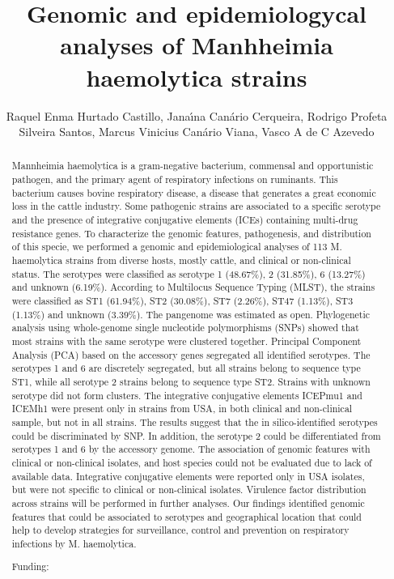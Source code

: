 \documentclass[twoside]{article}
\title{\vspace{-15mm}\fontsize{24pt}{10pt}\selectfont\textbf{ Genomic and epidemiologycal analyses of Manhheimia haemolytica strains }} %
\author{ Raquel Enma Hurtado Castillo, Jana\'{\i}na Can\'ario Cerqueira, Rodrigo Profeta Silveira Santos, Marcus Vinicius Can\'ario Viana, Vasco A de C Azevedo }
\affil{ UFMG }
\date{}
\begin{document}
  
  
  \maketitle %
  
  
  \thispagestyle{fancy} %
  
  
  \begin{abstract}
  Mannheimia haemolytica is a gram-negative bacterium,  commensal and opportunistic pathogen,  and the primary agent of respiratory infections on ruminants. This bacterium causes bovine respiratory disease,  a disease that generates a great economic loss in the cattle industry. Some pathogenic strains are associated to a specific serotype and the presence of integrative conjugative elements (ICEs) containing multi-drug resistance genes. To characterize the genomic features,  pathogenesis,  and distribution of this specie,  we performed a genomic and epidemiological analyses of 113 M. haemolytica strains from diverse hosts,  mostly cattle,  and clinical or non-clinical status. The serotypes were classified as serotype 1 (48.67\%),  2 (31.85\%),  6 (13.27\%) and unknown (6.19\%). According to Multilocus Sequence Typing (MLST),  the strains were classified as  ST1 (61.94\%),  ST2 (30.08\%),  ST7 (2.26\%),  ST47 (1.13\%),  ST3 (1.13\%) and unknown (3.39\%). The pangenome was estimated as open. Phylogenetic analysis using whole-genome single nucleotide polymorphisms (SNPs) showed that most strains with the same serotype were clustered together. Principal Component Analysis (PCA) based on the accessory genes segregated all identified serotypes. The serotypes 1 and 6 are discretely segregated,  but all strains belong to sequence type ST1,  while all serotype 2 strains belong to sequence type ST2. Strains with unknown serotype did not form clusters. The integrative conjugative elements ICEPmu1 and ICEMh1 were present only in strains from USA,  in both clinical and non-clinical sample,  but not in all strains. The results suggest that the in silico-identified serotypes could be discriminated by SNP. In addition,  the serotype 2 could be differentiated from serotypes 1 and 6 by the accessory genome. The association of genomic features with clinical or non-clinical isolates,  and host species could not be evaluated due to lack of available data. Integrative conjugative elements were reported only in USA isolates,  but were not specific to clinical or non-clinical isolates. Virulence factor distribution across strains will be performed in further analyses. Our findings identified genomic features that could be associated to serotypes and geographical location that could help to develop strategies for surveillance,  control and prevention on respiratory infections by M. haemolytica.
  
  Funding:  \\ 
  \end{abstract}
  
\end{document}
